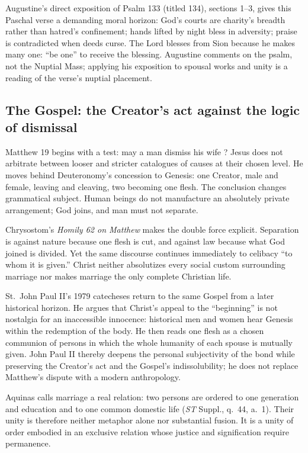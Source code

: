 Augustine's direct exposition of Psalm 133 (titled 134), sections 1--3, gives this Paschal verse a demanding moral horizon: God's courts are charity's breadth rather than hatred's confinement; hands lifted by night bless in adversity; praise is contradicted when deeds curse. The Lord blesses from Sion because he makes many one: ``be one'' to receive the blessing. Augustine comments on the psalm, not the Nuptial Mass; applying his exposition to spousal works and unity is a reading of the verse's nuptial placement.

\sectionguard
\subsection*{The Gospel: the Creator's act against the logic of dismissal\enspace{}}

Matthew 19 begins with a test: may a man dismiss his wife ? Jesus does not arbitrate between looser and stricter catalogues of causes at their chosen level. He moves behind Deuteronomy's concession to Genesis: one Creator, male and female, leaving and cleaving, two becoming one flesh. The conclusion changes grammatical subject. Human beings do not manufacture an absolutely private arrangement; God joins, and man must not separate.

Chrysostom's \emph{Homily 62 on Matthew} makes the double force explicit. Separation is against nature because one flesh is cut, and against law because what God joined is divided. Yet the same discourse continues immediately to celibacy ``to whom it is given.'' Christ neither absolutizes every social custom surrounding marriage nor makes marriage the only complete Christian life.

St.~John Paul II's 1979 catecheses return to the same Gospel from a later historical horizon. He argues that Christ's appeal to the ``beginning'' is not nostalgia for an inaccessible innocence: historical men and women hear Genesis within the redemption of the body. He then reads one flesh as a chosen communion of persons in which the whole humanity of each spouse is mutually given. John Paul II thereby deepens the personal subjectivity of the bond while preserving the Creator's act and the Gospel's indissolubility; he does not replace Matthew's dispute with a modern anthropology.

Aquinas calls marriage a real relation: two persons are ordered to one generation and education and to one common domestic life (\emph{ST} Suppl., q.~44, a.~1). Their unity is therefore neither metaphor alone nor substantial fusion. It is a unity of order embodied in an exclusive relation whose justice and signification require permanence.

